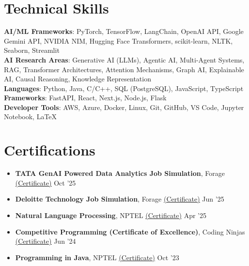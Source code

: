 \documentclass[letterpaper,11pt]{article}
\begin{document}
\section{Technical Skills}
 \begin{itemize}[leftmargin=0.15in, label={}]
    \small{\item{
     \textbf{AI/ML Frameworks}{: PyTorch, TensorFlow, LangChain, OpenAI API, Google Gemini API, NVIDIA NIM, Hugging Face Transformers, scikit-learn, NLTK, Seaborn, Streamlit} \\
     \textbf{AI Research Areas}{: Generative AI (LLMs), Agentic AI, Multi-Agent Systems, RAG, Transformer Architectures, Attention Mechanisms, Graph AI, Explainable AI, Causal Reasoning, Knowledge Representation} \\
     \textbf{Languages}{: Python, Java, C/C++, SQL (PostgreSQL), JavaScript, TypeScript} \\
     \textbf{Frameworks}{: FastAPI, React, Next.js, Node.js, Flask} \\
     \textbf{Developer Tools}{: AWS, Azure, Docker, Linux, Git, GitHub, VS Code, Jupyter Notebook, LaTeX} \\
    }}
 \end{itemize}

\section{Certifications}
\begin{itemize}[leftmargin=0.15in, label={}]
  \small\item{\textbf{TATA GenAI Powered Data Analytics Job Simulation}, Forage \href{https://www.theforage.com/completion-certificates/ifobHAoMjQs9s6bKS/gMTdCXwDdLYoXZ3wG_ifobHAoMjQs9s6bKS_TEDMb6o8madCwetbK_1759673341869_completion_certificate.pdf}{\underline{(Certificate)}} \hfill Oct '25}
  \small\item{\textbf{Deloitte Technology Job Simulation}, Forage \href{https://forage-uploads-prod.s3.amazonaws.com/completion-certificates/9PBTqmSxAf6zZTseP/udmxiyHeqYQLkTPvf_9PBTqmSxAf6zZTseP_TEDMb6o8madCwetbK_1751085370079_completion_certificate.pdf}{\underline{(Certificate)}} \hfill Jun '25}
  \small\item{\textbf{Natural Language Processing}, NPTEL \href{https://drive.google.com/file/d/1cWh8hPr6ttQioToQBsCkGL2_qT6fHM3Q/view?usp=sharing}{\underline{(Certificate)}} \hfill Apr '25}
  \small\item{\textbf{Competitive Programming (Certificate of Excellence)}, Coding Ninjas \href{https://certificate.codingninjas.com/view/3264b16618500623}{\underline{(Certificate)}} \hfill Jun '24}
  \small\item{\textbf{Programming in Java}, NPTEL \href{https://archive.nptel.ac.in/content/noc/NOC23/SEM2/Ecertificates/106/noc23-cs74/Course/NPTEL23CS74S83880108220365656.pdf}{\underline{(Certificate)}} \hfill Oct '23}
\end{itemize}
\end{document}
